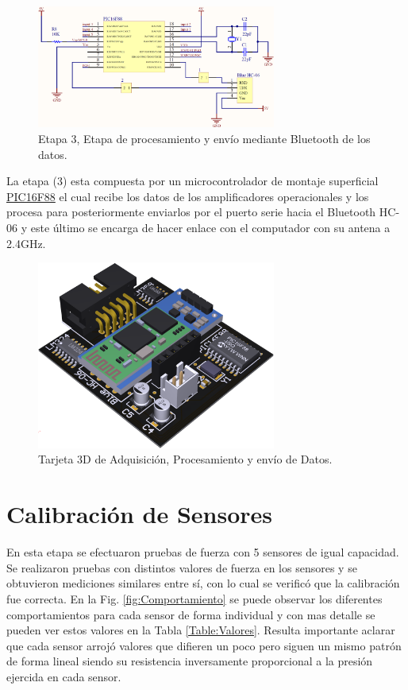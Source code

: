 \begin{figure}[H]
\centering
\includegraphics[width=0.7\textwidth]{./image/CircuitouControl.png}
\caption{Etapa 3, Etapa de procesamiento y envío mediante Bluetooth de los datos.}
\label{fig:EtapaProcesamiento}
\end{figure}

La etapa (3) esta compuesta por un microcontrolador de montaje superficial \href{http://ww1.microchip.com/downloads/en/DeviceDoc/30487c.pdf}{PIC16F88} el cual recibe los datos de los amplificadores operacionales y los procesa para posteriormente enviarlos por el puerto serie hacia el Bluetooth HC-06 y este último se encarga de hacer enlace con el computador con su antena a 2.4GHz.

\begin{figure}[H]
\centering
\includegraphics[width=0.7\textwidth]{./image/CircuitoSMD.png}
\caption{Tarjeta 3D de Adquisición, Procesamiento y envío de Datos.}
\label{fig:CircuitoSMD}
\end{figure}

\section{Calibración de Sensores}

En esta etapa se efectuaron pruebas de fuerza con 5 sensores de igual capacidad. Se realizaron pruebas con distintos valores de fuerza en los sensores y se obtuvieron mediciones similares entre sí, con lo cual se verificó que la calibración fue correcta. En la Fig. \ref{fig:Comportamiento} se puede observar los diferentes comportamientos para cada sensor de forma individual y con mas detalle se pueden ver estos valores en la Tabla \ref{Table:Valores}. Resulta importante aclarar que cada sensor arrojó valores que difieren un poco pero siguen un mismo patrón de forma lineal siendo su resistencia inversamente proporcional a la presión ejercida en cada sensor.

